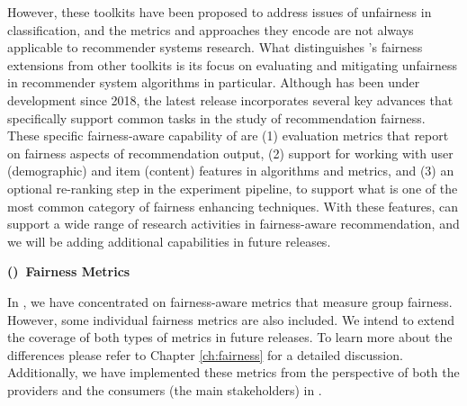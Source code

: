 However, these toolkits have been proposed to address issues of unfairness in classification, and the metrics and approaches they encode are not always applicable to recommender systems research. What distinguishes \libauto{}'s fairness extensions from other toolkits is its focus on evaluating and mitigating unfairness in recommender system algorithms in particular. Although \libauto{} has been under development since 2018, the latest release incorporates several key advances that specifically support common tasks in the study of recommendation fairness. These specific fairness-aware capability of \libauto{} are (1) evaluation metrics that report on fairness aspects of recommendation output, (2) support for working with user (demographic) and item (content) features in algorithms and metrics, and (3) an optional re-ranking step in the experiment pipeline, to support what is one of the most common category of fairness enhancing techniques.
With these features, \libauto{} can support a wide range of research activities in fairness-aware recommendation, and we will be adding additional capabilities in future releases.


\vspace{0.25cm}
\noindent \textbf{()~Fairness Metrics}
\vspace{0.25cm}
\label{subsubsec:libauto_fairmetrics}

In \libauto{}, we have concentrated on fairness-aware metrics that measure group fairness. However, some individual fairness metrics are also included. We intend to extend the coverage of both types of metrics in future releases. To learn more about the differences please refer to Chapter \ref{ch:fairness} for a detailed discussion. Additionally, we have implemented these metrics from the perspective of both the providers and the consumers (the main stakeholders) in \libauto{}.


